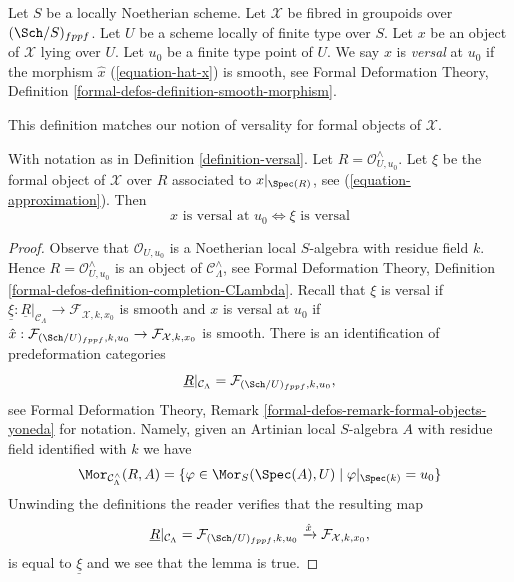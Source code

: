 \begin{definition}
\label{definition-versal}
Let $S$ be a locally Noetherian scheme.
Let $\mathcal{X}$ be fibred in groupoids over $(\Sch/S)_{fppf}$.
Let $U$ be a scheme locally of finite type over $S$.
Let $x$ be an object of $\mathcal{X}$ lying over $U$.
Let $u_0$ be a finite type point of $U$.
We say $x$ is {\it versal} at $u_0$ if the morphism $\hat x$
(\ref{equation-hat-x}) is smooth, see Formal Deformation Theory, Definition
\ref{formal-defos-definition-smooth-morphism}.
\end{definition}

\noindent
This definition matches our notion of versality for formal objects of
$\mathcal{X}$.

\begin{lemma}
\label{lemma-versality-matches}
With notation as in Definition \ref{definition-versal}.
Let $R = \mathcal{O}_{U, u_0}^\wedge$.
Let $\xi$ be the formal object of $\mathcal{X}$
over $R$ associated to $x|_{\Spec(R)}$, see (\ref{equation-approximation}).
Then
$$
x\text{ is versal at }u_0
\Leftrightarrow
\xi\text{ is versal}
$$
\end{lemma}

\begin{proof}
Observe that $\mathcal{O}_{U, u_0}$ is a Noetherian local $S$-algebra
with residue field $k$. Hence $R = \mathcal{O}_{U, u_0}^\wedge$ is an object of
$\mathcal{C}_\Lambda^\wedge$, see Formal Deformation Theory, Definition
\ref{formal-defos-definition-completion-CLambda}.
Recall that $\xi$ is versal if
$\underline{\xi} : \underline{R}|_{\mathcal{C}_\Lambda} \to
\mathcal{F}_{\mathcal{X}, k, x_0}$
is smooth and $x$ is versal at $u_0$ if
$\hat x : \mathcal{F}_{(\Sch/U)_{fppf}, k, u_0}
\to \mathcal{F}_{\mathcal{X}, k, x_0}$ is smooth.
There is an identification of predeformation categories
$$
\underline{R}|_{\mathcal{C}_\Lambda}
=
\mathcal{F}_{(\Sch/U)_{fppf}, k, u_0},
$$
see Formal Deformation Theory, Remark
\ref{formal-defos-remark-formal-objects-yoneda} for notation.
Namely, given an Artinian local $S$-algebra $A$ with residue field
identified with $k$ we have
$$
\Mor_{\mathcal{C}_\Lambda^\wedge}(R, A) =
\{\varphi \in \Mor_S(\Spec(A), U) \mid \varphi|_{\Spec(k)} = u_0\}
$$
Unwinding the definitions the reader verifies that the resulting map
$$
\underline{R}|_{\mathcal{C}_\Lambda} =
\mathcal{F}_{(\Sch/U)_{fppf}, k, u_0}
\xrightarrow{\hat x}
\mathcal{F}_{\mathcal{X}, k, x_0},
$$
is equal to $\underline{\xi}$ and we see that the lemma is true.
\end{proof}

